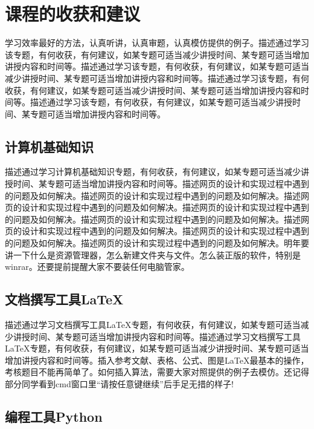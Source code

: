 \documentclass[supercite]{Experimental_Report}
\theoremstyle{definition}
\begin{document}
	\newpage
	
	\section{课程的收获和建议}
	
	学习效率最好的方法，认真听讲，认真审题，认真模仿提供的例子。描述通过学习该专题，有何收获，有何建议，如某专题可适当减少讲授时间、某专题可适当增加讲授内容和时间等。描述通过学习该专题，有何收获，有何建议，如某专题可适当减少讲授时间、某专题可适当增加讲授内容和时间等。描述通过学习该专题，有何收获，有何建议，如某专题可适当减少讲授时间、某专题可适当增加讲授内容和时间等。描述通过学习该专题，有何收获，有何建议，如某专题可适当减少讲授时间、某专题可适当增加讲授内容和时间等。
	
	\subsection{计算机基础知识}
	
	描述通过学习计算机基础知识专题，有何收获，有何建议，如某专题可适当减少讲授时间、某专题可适当增加讲授内容和时间等。描述网页的设计和实现过程中遇到的问题及如何解决。描述网页的设计和实现过程中遇到的问题及如何解决。描述网页的设计和实现过程中遇到的问题及如何解决。描述网页的设计和实现过程中遇到的问题及如何解决。描述网页的设计和实现过程中遇到的问题及如何解决。描述网页的设计和实现过程中遇到的问题及如何解决。描述网页的设计和实现过程中遇到的问题及如何解决。描述网页的设计和实现过程中遇到的问题及如何解决。明年要讲一下什么是资源管理器，怎么新建文件夹与文件。怎么装正版的软件，特别是winrar。还要提前提醒大家不要装任何电脑管家。
	
	\subsection{文档撰写工具LaTeX}
	
	描述通过学习文档撰写工具LaTeX专题，有何收获，有何建议，如某专题可适当减少讲授时间、某专题可适当增加讲授内容和时间等。描述通过学习文档撰写工具LaTeX专题，有何收获，有何建议，如某专题可适当减少讲授时间、某专题可适当增加讲授内容和时间等。插入参考文献、表格、公式、图是LaTeX最基本的操作，考核题目不能再简单了。如何插入算法，需要大家对照提供的例子去模仿。还记得部分同学看到cmd窗口里``请按任意键继续''后手足无措的样子!
	
	\subsection{编程工具Python}
	
\end{document}
